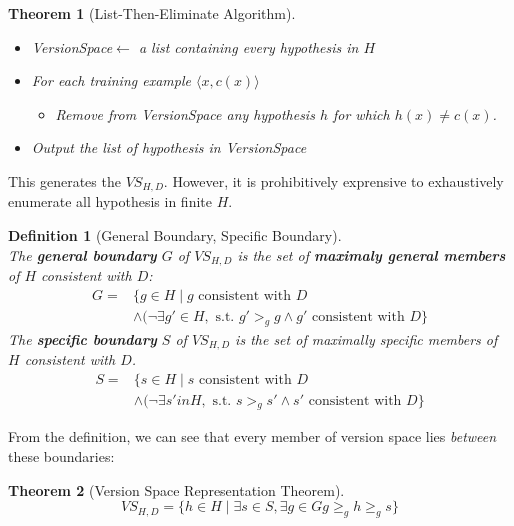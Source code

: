\documentclass[12pt]{article}
\newtheorem{definition}{Definition}[section]
\newtheorem{theorem}{Theorem}[section]
\theoremstyle{definition}
\begin{document}
\begin{theorem}[List-Then-Eliminate Algorithm]
\hfill\\\normalfont \begin{itemize}
\item \textit{VersionSpace}$\leftarrow$ a list containing every hypothesis in $H$
\item For each training example $\langle x, c(x)\rangle$
\begin{itemize}
	\item Remove from \textit{VersionSpace} any hypothesis $h$ for which $h(x)\neq c(x)$.
\end{itemize}
\item Output the list of hypothesis in \textit{VersionSpace}
\end{itemize}
\end{theorem}
This generates the $VS_{H,D}$. However, it is prohibitively exprensive to exhaustively enumerate all hypothesis in finite $H$.
\begin{definition}[General Boundary, Specific Boundary]
\hfill\\\normalfont The \textbf{general boundary} $G$ of $VS_{H,D}$ is the set of \textbf{maximaly general members} of $H$ consistent with $D$:
\begin{align*}
G=&\{g\in H\mid g\text{ consistent with } D \\
&\land (\neg \exists g' \in H,\text{ s.t. } g'>_g g \land g' \text{ consistent with } D\}
\end{align*}
The \textbf{specific boundary} $S$ of $VS_{H,D}$ is the set of maximally specific members of $H$ consistent with $D$.
\begin{align*}
S=&\{s\in H\mid s\text{ consistent with } D \\&\land (\neg \exists s' in H,\text{ s.t. } s>_g s' \land s' \text{ consistent with } D\}
\end{align*}
\end{definition}
From the definition, we can see that every member of version space lies \textit{between} these boundaries:
\begin{theorem}[Version Space Representation Theorem]
\hfill\\\normalfont 
\[
VS_{H,D}=\{h\in H\mid \exists s\in S, \exists g\in G g\geq_g h\geq_g s\}
\]
\end{theorem}
\end{document}

